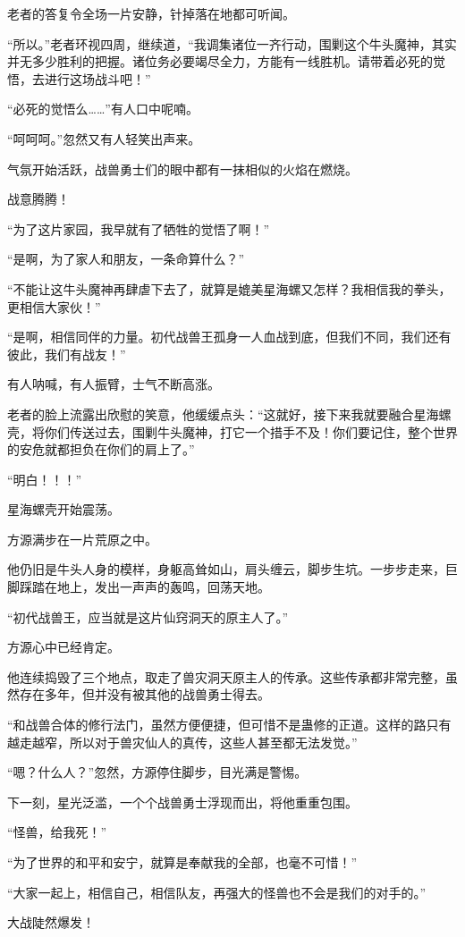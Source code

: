 \begin{this_body}
老者的答复令全场一片安静，针掉落在地都可听闻。

“所以。”老者环视四周，继续道，“我调集诸位一齐行动，围剿这个牛头魔神，其实并无多少胜利的把握。诸位务必要竭尽全力，方能有一线胜机。请带着必死的觉悟，去进行这场战斗吧！”

“必死的觉悟么……”有人口中呢喃。

“呵呵呵。”忽然又有人轻笑出声来。

气氛开始活跃，战兽勇士们的眼中都有一抹相似的火焰在燃烧。

战意腾腾！

“为了这片家园，我早就有了牺牲的觉悟了啊！”

“是啊，为了家人和朋友，一条命算什么？”

“不能让这牛头魔神再肆虐下去了，就算是媲美星海螺又怎样？我相信我的拳头，更相信大家伙！”

“是啊，相信同伴的力量。初代战兽王孤身一人血战到底，但我们不同，我们还有彼此，我们有战友！”

有人呐喊，有人振臂，士气不断高涨。

老者的脸上流露出欣慰的笑意，他缓缓点头：“这就好，接下来我就要融合星海螺壳，将你们传送过去，围剿牛头魔神，打它一个措手不及！你们要记住，整个世界的安危就都担负在你们的肩上了。”

“明白！！！”

星海螺壳开始震荡。

方源满步在一片荒原之中。

他仍旧是牛头人身的模样，身躯高耸如山，肩头缠云，脚步生坑。一步步走来，巨脚踩踏在地上，发出一声声的轰鸣，回荡天地。

“初代战兽王，应当就是这片仙窍洞天的原主人了。”

方源心中已经肯定。

他连续捣毁了三个地点，取走了兽灾洞天原主人的传承。这些传承都非常完整，虽然存在多年，但并没有被其他的战兽勇士得去。

“和战兽合体的修行法门，虽然方便便捷，但可惜不是蛊修的正道。这样的路只有越走越窄，所以对于兽灾仙人的真传，这些人甚至都无法发觉。”

“嗯？什么人？”忽然，方源停住脚步，目光满是警惕。

下一刻，星光泛滥，一个个战兽勇士浮现而出，将他重重包围。

“怪兽，给我死！”

“为了世界的和平和安宁，就算是奉献我的全部，也毫不可惜！”

“大家一起上，相信自己，相信队友，再强大的怪兽也不会是我们的对手的。”

大战陡然爆发！


\end{this_body}
